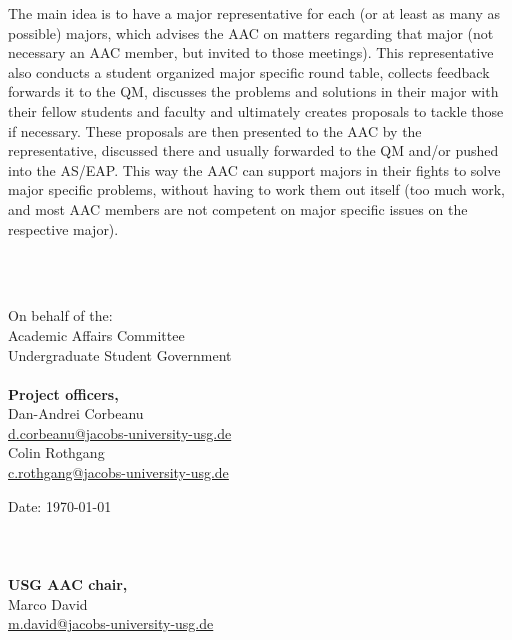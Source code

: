 \documentclass[a4paper,10pt]{article}
\makeatletter
\newcommand{\officer}[2]{#1\\\href{mailto:#2@jacobs-university-usg.de}{#2@jacobs-university-usg.de}}
\newcommand{\twoOfficer}[4]{\officer{#1}{#2}\\\officer{#3}{#4}}
\newcommand{\chair}{\officer{Marco David}{m.david}}
\makeatother
\begin{document}
 \maketitle
 \thispagestyle{main}
%	 
  The main idea is to have a major representative for each (or at least as many as possible) majors, which advises the AAC on matters regarding that major (not necessary an AAC member, but invited to those meetings). This representative also conducts a student organized major specific round table, collects feedback forwards it to the QM, discusses the problems and solutions in their major with their fellow students and faculty and ultimately creates proposals to tackle those if necessary. These proposals are then presented to the AAC by the representative, discussed there and usually forwarded to the QM and/or pushed into the AS/EAP. This way the AAC can support majors in their fights to solve major specific problems, without having to work them out itself (too much work, and most AAC members are not competent on major specific issues on the respective major).
  
   \ \\\ \\
  \begin{minipage}{0.5\textwidth}
  	\begin{flushleft}
  		On behalf of the:\\
  		Academic Affairs Committee\\
  		Undergraduate Student Government\\\ \\
  		\textbf{Project officers,}\\
  		\twoOfficer{Dan-Andrei Corbeanu}{d.corbeanu}{Colin Rothgang}{c.rothgang}
  	\end{flushleft}
  \end{minipage}
  \begin{minipage}{0.5\textwidth}
  	\begin{flushright}
  		Date: \today\\\ \\\ \\\ \\
  		\textbf{USG AAC chair,}\\
  		\chair\ \\\ \\\ \\
  	\end{flushright}
  \end{minipage}
  
  
 \label{theEnd}
\end{document}
